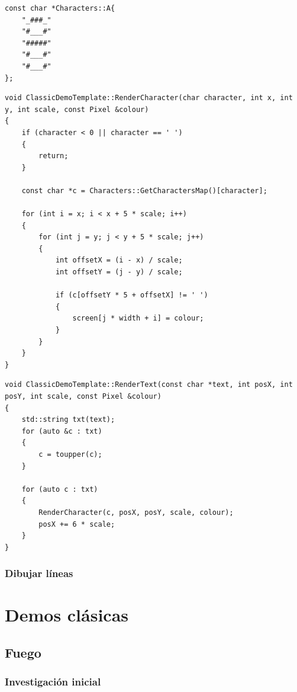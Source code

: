 \begin{lstlisting}[style=C-color, caption={Método que renderiza un sólo caracter},label=fontA]
const char *Characters::A{
    "_###_"
    "#___#"
    "#####"
    "#___#"
    "#___#"
};
\end{lstlisting}

\begin{lstlisting}[style=C-color, caption={Método que renderiza un sólo caracter},label=rendercharacter]
void ClassicDemoTemplate::RenderCharacter(char character, int x, int y, int scale, const Pixel &colour)
{
    if (character < 0 || character == ' ')
    {
        return;
    }

    const char *c = Characters::GetCharactersMap()[character];

    for (int i = x; i < x + 5 * scale; i++)
    {
        for (int j = y; j < y + 5 * scale; j++)
        {
            int offsetX = (i - x) / scale;
            int offsetY = (j - y) / scale;

            if (c[offsetY * 5 + offsetX] != ' ')
            {
                screen[j * width + i] = colour;
            }
        }
    }
}
\end{lstlisting}

\begin{lstlisting}[style=C-color, caption={Método que renderiza una cadena de caracteres},label=rendertext]
void ClassicDemoTemplate::RenderText(const char *text, int posX, int posY, int scale, const Pixel &colour)
{
    std::string txt(text);
    for (auto &c : txt)
    {
        c = toupper(c);
    }

    for (auto c : txt)
    {
        RenderCharacter(c, posX, posY, scale, colour);
        posX += 6 * scale;
    }
}
\end{lstlisting}

\subsection{Dibujar líneas}

\chapter{Demos clásicas}

\section{Fuego}

\subsection{Investigación inicial}
